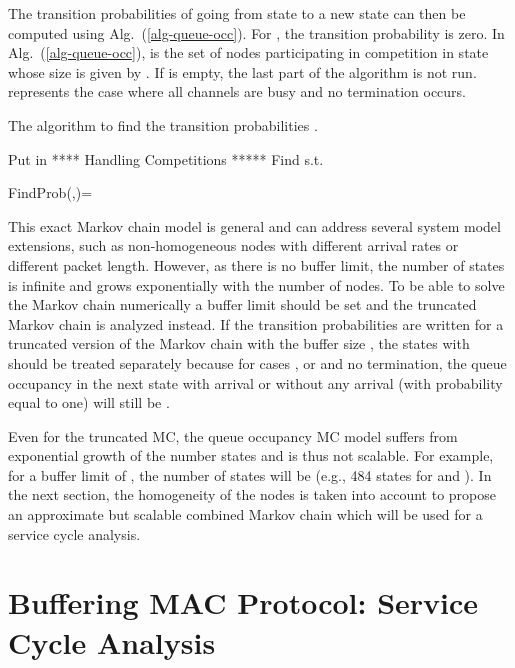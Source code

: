 \documentclass[12pt,journal,oneside,onecolumn]{IEEEtran}
\begin{document}
The transition probabilities of going from state  to a new state  can then be computed using Alg.~({\ref{alg-queue-occ}}). For , the transition probability is zero. 
In Alg.~(\ref{alg-queue-occ}),  is the set of nodes participating in competition in 
state  whose size is given by . If  is empty, the last part of the algorithm is not run.  represents the case where all channels are busy and no termination occurs. 
\begin{algorithm}[H]
\caption{\scriptsize{The algorithm to find the transition probabilities .}}
\label{alg-queue-occ}
\scriptsize
\begin{algorithmic}
\IF { \& }
\STATE 
\ENDIF
\FOR{}
\IF {}
    \STATE 
\ELSE
    \IF {}
\IF {}
    					\STATE 
					 \ELSE
    					\STATE 
    			 \ENDIF
\ELSE
    			 \STATE Put  in 
    			 \STATE 
    \ENDIF
\ENDIF
\ENDFOR
\STATE ***** Handling Competitions ***** 
\STATE Find  s.t.  
	  \IF {}
    	  \STATE 
    \ELSE
				\IF {}
							\STATE 
				\ENDIF
				
    \ENDIF



 \STATE FindProb(,)=
\end{algorithmic}
\end{algorithm}
\normalsize


This exact Markov chain model is general and can address several system model extensions, 
such as non-homogeneous nodes with different arrival rates or different packet length. 
However, as there is no buffer limit, the number of states is infinite and grows exponentially 
with the number of nodes. To be able to solve the Markov chain numerically a buffer limit  should be set
and the truncated Markov chain is analyzed instead. 
If the transition probabilities are written for a truncated version of the Markov chain with 
the buffer size , the states with  should 
be treated separately because for cases , or  and no termination, the queue 
occupancy in the next state with arrival or without any arrival (with probability equal to one) will still be .

Even for the truncated MC, the queue occupancy MC model suffers from exponential growth of the number states 
and is  thus not scalable. For example, for a buffer limit of , the number of 
states will be  (e.g., 484 states for  and ). 
In the next section, the homogeneity of the nodes is taken into account to propose an approximate but scalable combined Markov chain which will be used for a service cycle analysis.


\section{Buffering MAC Protocol: Service Cycle Analysis}
\label{sec:Service-Cycle}
 
\end{document}
